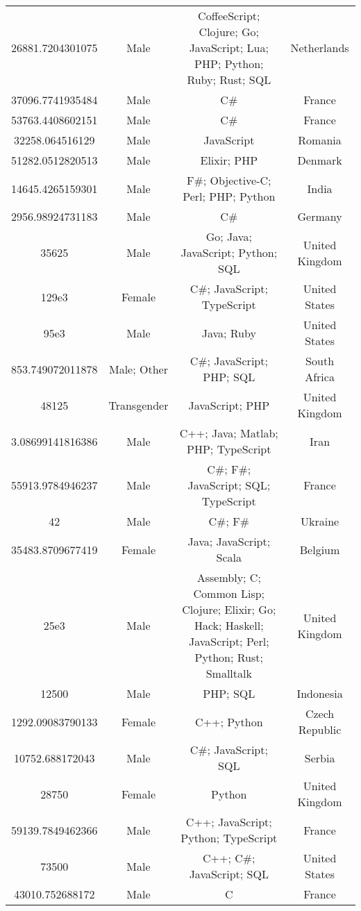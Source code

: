 \begin{center}
\begin{tabular}{ |c|c|c|c| }
26881.7204301075  &  Male  &  CoffeeScript; Clojure; Go; JavaScript; Lua; PHP; Python; Ruby; Rust; SQL  &  Netherlands  \\ 
37096.7741935484  &  Male  &  C\#  &  France  \\ 
53763.4408602151  &  Male  &  C\#  &  France  \\ 
32258.064516129  &  Male  &  JavaScript  &  Romania  \\ 
51282.0512820513  &  Male  &  Elixir; PHP  &  Denmark  \\ 
14645.4265159301  &  Male  &  F\#; Objective-C; Perl; PHP; Python  &  India  \\ 
2956.98924731183  &  Male  &  C\#  &  Germany  \\ 
35625  &  Male  &  Go; Java; JavaScript; Python; SQL  &  United Kingdom  \\ 
129e3  &  Female  &  C\#; JavaScript; TypeScript  &  United States  \\ 
95e3  &  Male  &  Java; Ruby  &  United States  \\ 
853.749072011878  &  Male; Other  &  C\#; JavaScript; PHP; SQL  &  South Africa  \\ 
48125  &  Transgender  &  JavaScript; PHP  &  United Kingdom  \\ 
3.08699141816386  &  Male  &  C++; Java; Matlab; PHP; TypeScript  &  Iran  \\ 
55913.9784946237  &  Male  &  C\#; F\#; JavaScript; SQL; TypeScript  &  France  \\ 
42  &  Male  &  C\#; F\#  &  Ukraine  \\ 
35483.8709677419  &  Female  &  Java; JavaScript; Scala  &  Belgium  \\ 
25e3  &  Male  &  Assembly; C; Common Lisp; Clojure; Elixir; Go; Hack; Haskell; JavaScript; Perl; Python; Rust; Smalltalk  &  United Kingdom  \\ 
12500  &  Male  &  PHP; SQL  &  Indonesia  \\ 
1292.09083790133  &  Female  &  C++; Python  &  Czech Republic  \\ 
10752.688172043  &  Male  &  C\#; JavaScript; SQL  &  Serbia  \\ 
28750  &  Female  &  Python  &  United Kingdom  \\ 
59139.7849462366  &  Male  &  C++; JavaScript; Python; TypeScript  &  France  \\ 
73500  &  Male  &  C++; C\#; JavaScript; SQL  &  United States  \\ 
43010.752688172  &  Male  &  C  &  France  \\ 

\end{tabular}
\end{center}

